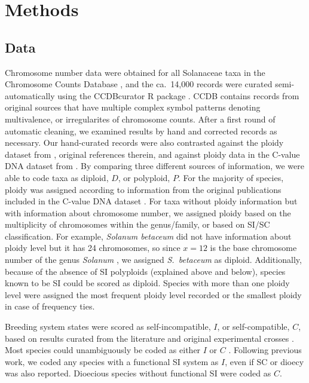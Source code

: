 \section{Methods}

\subsection{Data}


Chromosome number data were obtained for all Solanaceae taxa in the Chromosome Counts Database \citep[CCDB;][]{rice_2015}, and the ca.~14,000 records were curated semi-automatically using the \mbox{CCDBcurator} R package \citep{rivero_2019}.
CCDB contains records from original sources that have multiple complex symbol patterns denoting multivalence, or irregularites of chromosome counts.
After a first round of automatic cleaning, we examined results by hand and corrected records as necessary.
Our hand-curated records were also contrasted against the ploidy dataset from \citet{robertson_2011}, original references therein, and against ploidy data in the C-value DNA dataset from \citet{bennett_2005}.
By comparing three different sources of information, we were able to code taxa as diploid, $D$, or polyploid, $P$.
For the majority of species, ploidy was assigned according to information from the original publications included in the  C-value DNA dataset \citep{bennett_2005}.
For taxa without ploidy information but with information about chromosome number, we assigned ploidy based on the multiplicity of chromosomes within the genus/family, or based on SI/SC classification.
For example, \textit{Solanum betaceum} did not have information about ploidy level but it has 24 chromosomes, so since $x=12$ is the base chromosome number of the genus \textit{Solanum} \citep{olmstead_2007}, we assigned \textit{S.~betaceum} as diploid. 
Additionally, because of the absence of SI polyploids (explained above and below), species known to be SI could be scored as diploid.
Species with more than one ploidy level were assigned the most frequent ploidy level recorded or the smallest ploidy in case of frequency ties.

Breeding system states were scored as self-incompatible, $I$, or self-compatible, $C$, based on results curated from the literature and original experimental crosses \citep[as compiled in][]{igic_2006, goldberg_2010, robertson_2011, goldberg_2012}.
Most species could unambiguously be coded as either $I$ or $C$ \citep{raduski_2012}.
Following previous work, we coded any species with a functional SI system as $I$, even if SC or dioecy was also reported.
Dioecious species without functional SI were coded as $C$.

